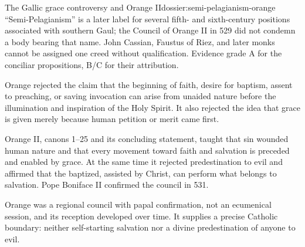 \begin{heresydossier}{The Gallic grace controversy and Orange II}{dossier:semi-pelagianism-orange}
\objectfield ``Semi-Pelagianism'' is a later label for several fifth- and sixth-century positions associated with southern Gaul; the Council of Orange II in 529 did not condemn a body bearing that name. John Cassian, Faustus of Riez, and later monks cannot be assigned one creed without qualification. Evidence grade A for the conciliar propositions, B/C for their attribution.

\propositionfield Orange rejected the claim that the beginning of faith, desire for baptism, assent to preaching, or saving invocation can arise from unaided nature before the illumination and inspiration of the Holy Spirit. It also rejected the idea that grace is given merely because human petition or merit came first.

\responsefield Orange II, canons 1--25 and its concluding statement, taught that sin wounded human nature and that every movement toward faith and salvation is preceded and enabled by grace. At the same time it rejected predestination to evil and affirmed that the baptized, assisted by Christ, can perform what belongs to salvation. Pope Boniface II confirmed the council in 531.

\aftermathfield Orange was a regional council with papal confirmation, not an ecumenical session, and its reception developed over time. It supplies a precise Catholic boundary: neither self-starting salvation nor a divine predestination of anyone to evil.
\end{heresydossier}

